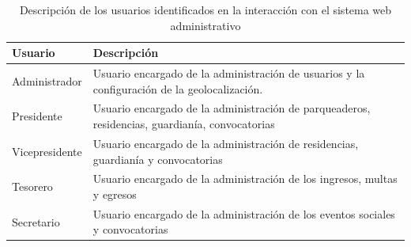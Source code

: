\begin{footnotesize}
\begin{spacing}{1}

    \begin{center}
        \renewcommand*{\arraystretch}{1.4}
        \begin{longtable}{|p{}|p{}|}
            \caption{Descripción de los usuarios identificados en la interacción con el sistema web administrativo}\label{tab:table_usuarios_web}\\
            \hline
            \textbf{Usuario} & \textbf{Descripción}                                                                           \\
            \hline
            Administrador    & Usuario encargado de la administración de usuarios y la configuración de la geolocalización.   \\
            \hline
            Presidente       & Usuario encargado de la administración de parqueaderos, residencias, guardianía, convocatorias \\
            \hline
            Vicepresidente   & Usuario encargado de la administración de residencias, guardianía y convocatorias              \\
            \hline
            Tesorero         & Usuario encargado de la administración de los ingresos, multas y egresos                       \\
            \hline
            Secretario       & Usuario encargado de la administración de los eventos sociales y convocatorias                 \\
            \hline
        \end{longtable}
    \end{center}
\end{spacing}
\end{footnotesize}


